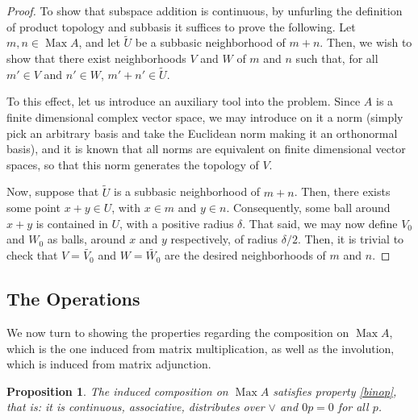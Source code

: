 \documentclass{article}
\theoremstyle{plain}
\newtheorem{prop}{Proposition}
\theoremstyle{nonumberplain}
\newtheorem{proof}{Proof}
\DeclareMathOperator{\Max}{Max}
\begin{document}
\begin{proof}
To show that subspace addition is continuous, by unfurling the definition of product topology and subbasis it suffices to prove the following. Let $m,n \in \Max A$, and let $\tilde U$ be a subbasic neighborhood of $m+n$. Then, we wish to show that there exist neighborhoods $V$ and $W$ of $m$ and $n$ such that, for all $m' \in V$ and $n' \in W$, $m'+n' \in \tilde U$.

To this effect, let us introduce an auxiliary tool into the problem. Since $A$ is a finite dimensional complex vector space, we may introduce on it a norm (simply pick an arbitrary basis and take the Euclidean norm making it an orthonormal basis), and it is known that all norms are equivalent on finite dimensional vector spaces, so that this norm generates the topology of $V$.

Now, suppose that $\tilde U$ is a subbasic neighborhood of $m+n$. Then, there exists some point $x+y \in U$, with $x \in m$ and $y \in n$. Consequently, some ball around $x+y$ is contained in $U$, with a positive radius $\delta$. That said, we may now define $V_0$ and $W_0$ as balls, around $x$ and $y$ respectively, of radius $\delta/2$. Then, it is trivial to check that $V = \tilde{V_0}$ and $W = \tilde{W_0}$ are the desired neighborhoods of $m$ and $n$.
\end{proof}

\subsection{The Operations}

We now turn to showing the properties regarding the composition on $\Max A$, which is the one induced from matrix multiplication, as well as the involution, which is induced from matrix adjunction.

\begin{prop}
The induced composition on $\Max A$ satisfies property \ref{binop}, that is: it is continuous, associative, distributes over $\lor$ and $0p = 0$ for all $p$.
\end{prop}
\end{document}
